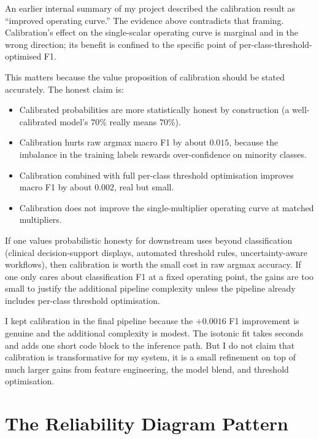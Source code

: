 \begin{remarkbox}
An earlier internal summary of my project described the calibration result as ``improved operating curve.'' The evidence above contradicts that framing. Calibration's effect on the single-scalar operating curve is marginal and in the wrong direction; its benefit is confined to the specific point of per-class-threshold-optimised F1.

This matters because the value proposition of calibration should be stated accurately. The honest claim is:

\begin{itemize}
 \item Calibrated probabilities are more statistically honest by construction (a well-calibrated model's $70\%$ really means $70\%$).
 \item Calibration hurts raw argmax macro F1 by about $0.015$, because the imbalance in the training labels rewards over-confidence on minority classes.
 \item Calibration combined with full per-class threshold optimisation improves macro F1 by about $0.002$, real but small.
 \item Calibration does not improve the single-multiplier operating curve at matched multipliers.
\end{itemize}

If one values probabilistic honesty for downstream uses beyond classification (clinical decision-support displays, automated threshold rules, uncertainty-aware workflows), then calibration is worth the small cost in raw argmax accuracy. If one only cares about classification F1 at a fixed operating point, the gains are too small to justify the additional pipeline complexity unless the pipeline already includes per-class threshold optimisation.
\end{remarkbox}

I kept calibration in the final pipeline because the $+0.0016$ F1 improvement is genuine and the additional complexity is modest. The isotonic fit takes seconds and adds one short code block to the inference path. But I do not claim that calibration is transformative for my system, it is a small refinement on top of much larger gains from feature engineering, the model blend, and threshold optimisation.

\section{The Reliability Diagram Pattern}


